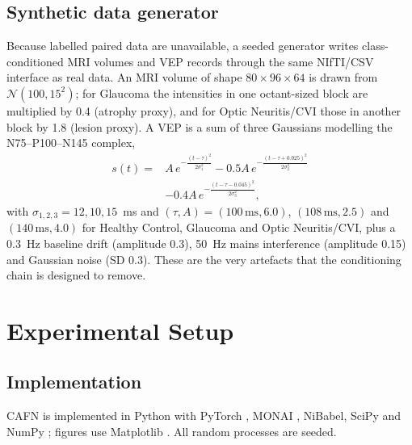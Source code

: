\documentclass{ieeeaccessapprox}
\begin{document}
\subsection{Synthetic data generator}\label{sec:synth}
Because labelled paired data are unavailable, a seeded generator writes class-conditioned MRI volumes and VEP records through the same NIfTI/CSV interface as real data. An MRI volume of shape $80\times96\times64$ is drawn from $\mathcal{N}(100,15^2)$; for Glaucoma the intensities in one octant-sized block are multiplied by 0.4 (atrophy proxy), and for Optic Neuritis/CVI those in another block by 1.8 (lesion proxy). A VEP is a sum of three Gaussians modelling the N75--P100--N145 complex,
\begin{equation}
\begin{split}
s(t)={}&A\,e^{-\frac{(t-\tau)^2}{2\sigma_1^2}}-0.5A\,e^{-\frac{(t-\tau+0.025)^2}{2\sigma_2^2}}\\
&-0.4A\,e^{-\frac{(t-\tau-0.045)^2}{2\sigma_3^2}},
\end{split}
\end{equation}
with $\sigma_{1,2,3}=12,10,15$~ms and $(\tau,A)=(100\,\mathrm{ms},6.0)$, $(108\,\mathrm{ms},2.5)$ and $(140\,\mathrm{ms},4.0)$ for Healthy Control, Glaucoma and Optic Neuritis/CVI, plus a 0.3~Hz baseline drift (amplitude 0.3), 50~Hz mains interference (amplitude 0.15) and Gaussian noise (SD 0.3). These are the very artefacts that the conditioning chain is designed to remove.

\section{Experimental Setup}\label{sec:setup}
\subsection{Implementation}
CAFN is implemented in Python with PyTorch \cite{paszke2019}, MONAI \cite{cardoso2022}, NiBabel, SciPy \cite{virtanen2020} and NumPy \cite{harris2020}; figures use Matplotlib \cite{hunter2007}. All random processes are seeded.
\end{document}
